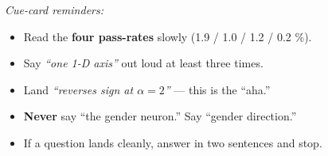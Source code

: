 \documentclass[11pt]{article}
\begin{document}
\vspace{6pt}
\noindent\small\textit{Cue-card reminders:}
\begin{itemize}
  \item Read the \textbf{four pass-rates} slowly (1.9 / 1.0 / 1.2 / 0.2 \%).
  \item Say \emph{``one 1-D axis''} out loud at least three times.
  \item Land \emph{``reverses sign at $\alpha{=}2$''} --- this is the ``aha.''
  \item \textbf{Never} say ``the gender neuron.'' Say ``gender direction.''
  \item If a question lands cleanly, answer in two sentences and stop.
\end{itemize}
\end{document}
